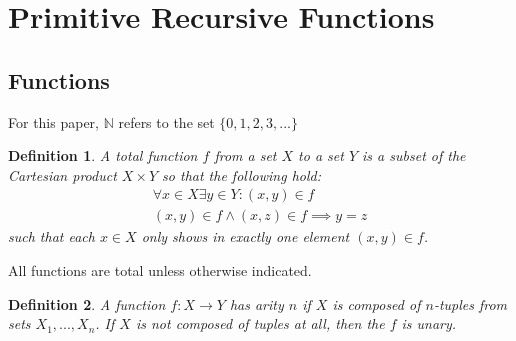\documentclass[12pt, letterpaper]{article}
\newtheorem*{definition}{Definition}
\theoremstyle{case}
\begin{document}
  \section{Primitive Recursive Functions}
    \subsection{Functions}
      For this paper, $\mathbb{N}$ refers to the set $\{0, 1, 2, 3, ...\}$
    
    \begin{definition}
      A total function $f$ from a set $X$ to a set $Y$ is a subset of the Cartesian product $X \times Y$ so that the following hold:
      \begin{equation*}
        \begin{gathered}
          \forall x \in X \exists y \in Y : (x, y) \in f \\
          (x, y) \in f \wedge (x, z) \in f \implies y = z
        \end{gathered}
      \end{equation*}
      such that each $x \in X$ only shows in exactly one element $(x, y) \in f$.
    \end{definition}

    All functions are total unless otherwise indicated.

    \begin{definition}
      A function $f: X \rightarrow Y$ has arity $n$ if $X$ is composed of $n$-tuples from sets $X_1, ..., X_n$.
      If $X$ is not composed of tuples at all, then the $f$ is unary.
    \end{definition}
\end{document}
